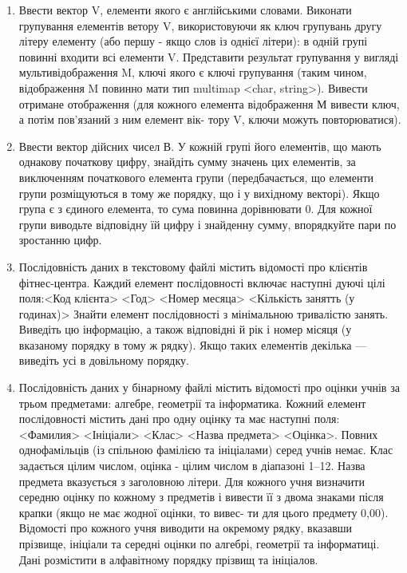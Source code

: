 \documentclass[a5paper,titlepage,openany,twoside,draft]{book_unv}%
\begin{document}
\begin{enumerate}
\item
Ввести вектор V, елементи якого є англійськими словами. 
Виконати групування елементів ветору V, використовуючи як ключ групувань 
другу літеру елементу (або першу - якщо слов із однієї літери):
в одній групі повинні входити всі елементи V. Представити результат групування
у вигляді мультивідображення M, ключі якого є ключі
групування (таким чином, відображення M повинно мати тип multimap <char, string>).
Вивести отримане отображення (для кожного елемента відображення
М вивести ключ, а потім пов'язаний з ним елемент вік-
тору V, ключи можуть повторюватися).

\item
Ввести вектор дійсних чисел В. У кожній групі його елементів, що мають однакову початкову цифру,
 знайдіть сумму значень цих елементів, за виключенням початкового елемента групи (передбачається, що
елементи групи розміщуються в тому же порядку, що і у вихідному
векторі). Якщо група є з єдиного елемента, то сума
повинна дорівнювати 0. Для кожної групи виводьте відповідну
їй цифру і знайденну сумму, впорядкуйте пари по зростанню цифр. 

\item
Послідовність даних в текстовому файлі містить відомості про клієнтів
фітнес-центра. Каждий елемент послідовності включає наступні
дуючі цілі поля:<Код клієнта> <Год> <Номер месяца> <Кількість занятть (у годинах)>
Знайти елемент послідовності з мінімальною тривалістю занять.
 Виведіть цю інформацію, а також відповідні й рік і номер місяця 
(у вказаному порядку в тому ж рядку).
Якщо таких елементів декілька --- виведіть усі в довільному порядку.

\item
Послідовність даних у бінарному файлі містить відомості про оцінки
учнів за трьом предметами: алгебре, геометрії та інформатика.
Кожний елемент послідовності містить дані про одну
оцінку та має наступні поля:
<Фамилия> <Ініціали> <Клас> <Назва предмета> <Оцінка>. 
Повних однофамільців (із спільною фамілією та ініціалами)
серед учнів немає. Клас задається цілим числом, оцінка - цілим
числом в діапазоні 1–12. Назва предмета вказується з заголовною
літери. Для кожного учня визначити середню оцінку по кожному з предметів і
 вивести її з двома знаками після крапки (якщо не має жодної оцінки, то вивес-
ти для цього предмету 0,00). Відомості про кожного учня виводити
на окремому рядку, вказавши прізвище, ініціали та середні оцінки
по алгебрі, геометрії та інформатиці. Дані розмістити в алфавітному порядку
прізвищ та ініціалов. 


\end{enumerate}
\end{document}
